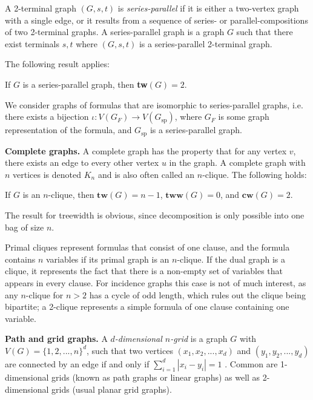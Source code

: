 A 2-terminal graph $(G, s, t)$ is {\em series-parallel} if it is either a two-vertex graph with a single edge,
or it results from a sequence of series- or parallel-compositions of two 2-terminal graphs.
A series-parallel graph is a graph $G$ such that there exist terminals $s, t$ where $(G, s, t)$ is a series-parallel 2-terminal graph.

The following result applies:

\begin{fact}
	If $G$ is a series-parallel graph, then \textbf{tw}$(G) = 2$. 
\end{fact}

\noindent
We consider graphs of formulas that are isomorphic to series-parallel graphs, i.e. there exists a bijection $\iota : V(G_F) \rightarrow V(G_{\text{sp}})$, where $G_F$ is some graph representation of the formula, and $G_{\text{sp}}$ is a series-parallel graph.

\textbf{Complete graphs.}
A complete graph has the property that for any vertex $v$, there exists an edge to every other vertex $u$ in the graph.
A complete graph with $n$ vertices is denoted $K_n$ and is also often called an $n$-clique.
The following holds:
\begin{fact}
	If $G$ is an $n$-clique, then $\mathbf{tw}(G) = n - 1$, $\mathbf{tww}(G) = 0$, and $\mathbf{cw}(G) = 2$.
\end{fact}

\noindent
The result for treewidth is obvious, since decomposition is only possible into one bag of size $n$.

{\color{lightgray} Primal cliques represent formulas that consist of one clause, and the formula contains $n$ variables if its primal graph is an $n$-clique.
If the dual graph is a clique, it represents the fact that there is a non-empty set of variables that appears in every clause.
For incidence graphs this case is not of much interest, as any $n$-clique for $n > 2$ has a cycle of odd length, which rules out the clique being bipartite; a 2-clique represents a simple formula of one clause containing one variable.}

\textbf{Path and grid graphs.}
A {\em $d$-dimensional $n$-grid} is a graph $G$ with $V(G) = \{1, 2, ..., n\}^d$, such that two vertices $(x_1, x_2, ..., x_d)$ and $(y_1, y_2, ..., y_d)$ are connected by an edge if and only if $\sum_{i=1}^d |x_i - y_i| = 1$ \cite{DBLP:conf/focs/Bonnet0TW20}.
Common are 1-dimensional grids (known as path graphs or linear graphs) as well as 2-dimensional grids (usual planar grid graphs).

